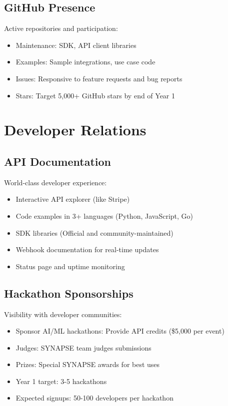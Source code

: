 \documentclass{report}
\begin{document}
\subsection{GitHub Presence}

Active repositories and participation:

\begin{itemize}
    \item Maintenance: SDK, API client libraries
    \item Examples: Sample integrations, use case code
    \item Issues: Responsive to feature requests and bug reports
    \item Stars: Target 5,000+ GitHub stars by end of Year 1
\end{itemize}

\section{Developer Relations}

\subsection{API Documentation}

World-class developer experience:

\begin{itemize}
    \item Interactive API explorer (like Stripe)
    \item Code examples in 3+ languages (Python, JavaScript, Go)
    \item SDK libraries (Official and community-maintained)
    \item Webhook documentation for real-time updates
    \item Status page and uptime monitoring
\end{itemize}

\subsection{Hackathon Sponsorships}

Visibility with developer communities:

\begin{itemize}
    \item Sponsor AI/ML hackathons: Provide API credits (\$5,000 per event)
    \item Judges: SYNAPSE team judges submissions
    \item Prizes: Special SYNAPSE awards for best uses
    \item Year 1 target: 3-5 hackathons
    \item Expected signups: 50-100 developers per hackathon
\end{itemize}
\end{document}
